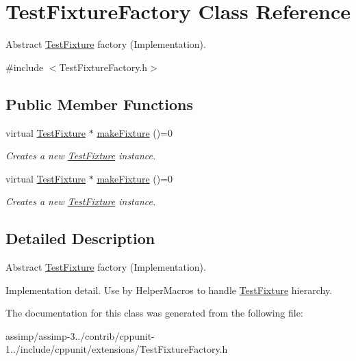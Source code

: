 \hypertarget{class_test_fixture_factory}{\section{Test\+Fixture\+Factory Class Reference}
\label{class_test_fixture_factory}
}


Abstract \hyperlink{class_test_fixture}{Test\+Fixture} factory (Implementation).  




{\ttfamily \#include $<$Test\+Fixture\+Factory.\+h$>$}

\subsection*{Public Member Functions}
\begin{DoxyCompactItemize}
\item 
\hypertarget{class_test_fixture_factory_a50ae33b88d818ef819478e47929a820c}{virtual \hyperlink{class_test_fixture}{Test\+Fixture} $\ast$ \hyperlink{class_test_fixture_factory_a50ae33b88d818ef819478e47929a820c}{make\+Fixture} ()=0}\label{class_test_fixture_factory_a50ae33b88d818ef819478e47929a820c}

\begin{DoxyCompactList}\small\item\em Creates a new \hyperlink{class_test_fixture}{Test\+Fixture} instance. \end{DoxyCompactList}\item 
\hypertarget{class_test_fixture_factory_a50ae33b88d818ef819478e47929a820c}{virtual \hyperlink{class_test_fixture}{Test\+Fixture} $\ast$ \hyperlink{class_test_fixture_factory_a50ae33b88d818ef819478e47929a820c}{make\+Fixture} ()=0}\label{class_test_fixture_factory_a50ae33b88d818ef819478e47929a820c}

\begin{DoxyCompactList}\small\item\em Creates a new \hyperlink{class_test_fixture}{Test\+Fixture} instance. \end{DoxyCompactList}\end{DoxyCompactItemize}


\subsection{Detailed Description}
Abstract \hyperlink{class_test_fixture}{Test\+Fixture} factory (Implementation). 

Implementation detail. Use by Helper\+Macros to handle \hyperlink{class_test_fixture}{Test\+Fixture} hierarchy. 

The documentation for this class was generated from the following file\+:\begin{DoxyCompactItemize}
\item 
assimp/assimp-\/3../contrib/cppunit-\/1../include/cppunit/extensions/Test\+Fixture\+Factory.\+h\end{DoxyCompactItemize}
